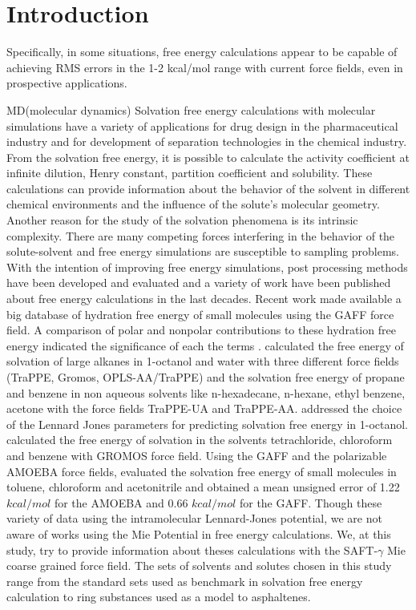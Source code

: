 \chapter{Introduction} %

\label{Chapter1} %
Specifically, in some
situations, free energy calculations appear to be capable
of achieving RMS errors in the 1-2 kcal/mol range with
current force fields, even in prospective applications.

MD(molecular dynamics) Solvation free energy calculations with molecular simulations have a variety of applications for drug design in the pharmaceutical industry  and for development of separation technologies in the chemical industry. From  the solvation free energy, it is possible to calculate the activity coefficient at infinite dilution, Henry constant, partition coefficient and solubility. These calculations can provide information about the behavior of the solvent in different chemical environments and the influence of the solute's molecular geometry. Another reason for the study of the solvation phenomena is its intrinsic complexity. There are many competing forces interfering in the behavior of the solute-solvent and free energy simulations are susceptible to sampling problems. With the intention of improving free energy simulations, post processing methods \cite{mbar,bareva,dexp,gdel} have been developed and evaluated and a variety of work have been published about free energy calculations in the last decades. Recent work \cite{mobley2014,mobley2017} made available a big database of hydration free energy of small molecules using the GAFF force field. A comparison of polar and nonpolar contributions to these hydration free energy indicated the significance of each the terms  \cite{izairi2017}.  calculated the free energy of solvation of large alkanes in 1-octanol and water with three different force fields (TraPPE, Gromos, OPLS-AA/TraPPE) and the solvation free energy of propane and benzene in non aqueous solvents like n-hexadecane, n-hexane, ethyl benzene, acetone  with the force fields TraPPE-UA and TraPPE-AA.  addressed the choice of the Lennard Jones parameters for predicting solvation free energy in 1-octanol.  calculated the free energy of solvation in the solvents tetrachloride, chloroform and benzene with GROMOS force field. Using the GAFF and the polarizable AMOEBA force fields,  evaluated the solvation free energy of small molecules in toluene, chloroform and acetonitrile and obtained a mean unsigned error of 1.22 $kcal/mol$ for the AMOEBA and 0.66 $kcal/mol$ for the GAFF. Though these variety of data using the intramolecular Lennard-Jones potential, we are not aware of works using the Mie Potential\cite{MIE} in free energy calculations. We, at this study, try to provide information about theses calculations with the SAFT-$\gamma$ Mie coarse grained force field. The sets of solvents and solutes chosen in this study range from the standard sets used as benchmark in solvation free energy calculation to ring substances used as a model to asphaltenes. 